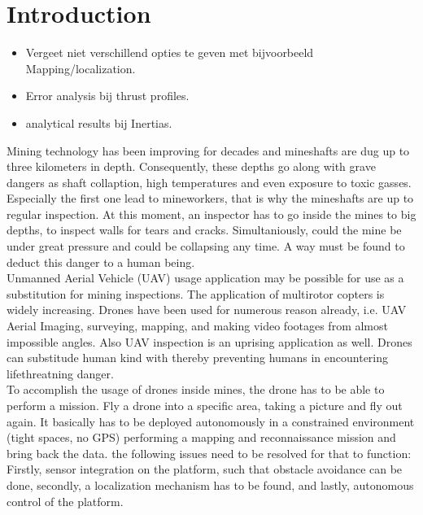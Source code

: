 \chapter{Introduction}
\begin{itemize}
\item Vergeet niet verschillend opties te geven met bijvoorbeeld Mapping/localization.\\
\item Error analysis bij thrust profiles.\\
\item analytical results bij Inertias.\\
\end{itemize}



Mining technology has been improving for decades and mineshafts are dug up to three kilometers in depth. Consequently, these depths go along with grave dangers as shaft collaption, high temperatures and even exposure to toxic gasses. Especially the first one lead to mineworkers, that is why the mineshafts are up to regular inspection. At this moment, an inspector has to go inside the mines to big depths, to inspect walls for tears and cracks. Simultaniously, could the mine be under great pressure and could be collapsing any time. A way must be found to deduct this danger to a human being.\\

Unmanned Aerial Vehicle (UAV) usage application may be possible for use as a substitution for mining inspections. The application of multirotor copters is widely increasing. Drones have been used for numerous reason already, i.e. UAV Aerial Imaging, surveying, mapping, and making video footages from almost impossible angles. Also UAV inspection is an uprising application as well. Drones can substitude human kind with thereby preventing humans in encountering lifethreatning danger.\\

To accomplish the usage of drones inside mines, the drone has to be able to perform a mission. Fly a drone into a specific area, taking a picture and fly out again. It basically has to be deployed autonomously in a constrained environment (tight spaces, no GPS) performing a mapping and reconnaissance mission and bring back the data. the following issues need to be resolved for that to function: Firstly, sensor integration on the platform, such that obstacle avoidance can be done, secondly, a localization mechanism has to be found, and lastly, autonomous control of the platform. \\

